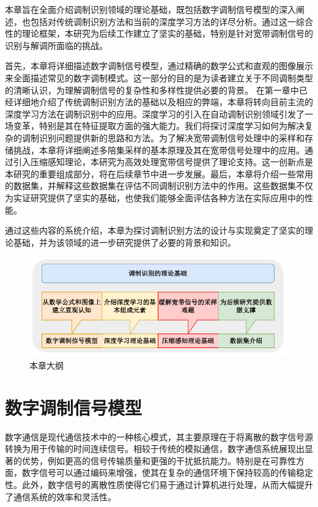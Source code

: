 本章旨在全面介绍调制识别领域的理论基础，既包括数字调制信号模型的深入阐述，也包括对传统调制识别方法和当前的深度学习方法的详尽分析。通过这一综合性的理论框架，本研究为后续工作建立了坚实的基础，特别是针对宽带调制信号的识别与解调所面临的挑战。

首先，本章将详细描述数字调制信号模型，通过精确的数学公式和直观的图像展示来全面描述常见的数字调制模式。这一部分的目的是为读者建立关于不同调制类型的清晰认识，为理解调制信号的复杂性和多样性提供必要的背景。
在第一章中已经详细地介绍了传统调制识别方法的基础以及相应的弊端，本章将转向目前主流的深度学习方法在调制识别中的应用。深度学习的引入在自动调制识别领域引发了一场变革，特别是其在特征提取方面的强大能力。我们将探讨深度学习如何为解决复杂的调制识别问题提供新的思路和方法。为了解决宽带调制信号处理中的采样和存储挑战，本章将详细阐述多陪集采样的基本原理及其在宽带信号处理中的应用。通过引入压缩感知理论，本研究为高效处理宽带信号提供了理论支持。这一创新点是本研究的重要组成部分，将在后续章节中进一步发展。最后，本章将介绍一些常用的数据集，并解释这些数据集在评估不同调制识别方法中的作用。这些数据集不仅为实证研究提供了坚实的基础，也使我们能够全面评估各种方法在实际应用中的性能。

通过这些内容的系统介绍，本章为探讨调制识别方法的设计与实现奠定了坚实的理论基础，并为该领域的进一步研究提供了必要的背景和知识。

\begin{figure}
    \centering
    \includegraphics[width=\textwidth]{Image/chap2_map.pdf}
    \caption{本章大纲}
    \label{fig:outline2}
\end{figure}

\section{数字调制信号模型}\label{sec:background}
数字通信是现代通信技术中的一种核心模式，其主要原理在于将离散的数字信号源转换为用于传输的时间连续信号。相较于传统的模拟通信，数字通信系统展现出显著的优势，例如更高的信号传输质量和更强的干扰抵抗能力。特别是在可靠性方面，数字信号可以通过编码来增强，使其在复杂的通信环境下保持较高的传输稳定性。此外，数字信号的离散性质使得它们易于通过计算机进行处理，从而大幅提升了通信系统的效率和灵活性。

